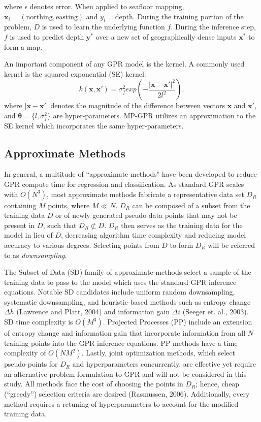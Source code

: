 \documentclass{article}
\begin{document}
where $\epsilon$ denotes error. When applied to seafloor mapping, $\boldsymbol{x}_i = (\mathrm{northing}, \mathrm{easting})$ and $y_i = \mathrm{depth}$. During the training portion of the problem, $D$ is used to learn the underlying function $f$.  During the inference step, $f$ is used to predict depth $\boldsymbol{y}^*$ over a new set of geographically dense inputs $\boldsymbol{x^*}$ to form a map.

An important component of any GPR model is the kernel. A commonly used kernel is the squared exponential (SE) kernel:
\begin{equation}
    k(\boldsymbol{x},\boldsymbol{x'}) = \sigma_f^2 exp(-\frac{|\boldsymbol{x}-\boldsymbol{x'}|^2}{2l^2}),
\end{equation}
where $|\boldsymbol{x}-\boldsymbol{x'}|$ denotes the magnitude of the difference between vectors $\boldsymbol{x}$ and $\boldsymbol{x'}$, and $\boldsymbol{\theta} = \{l,\sigma_f^2\}$ are hyper-parameters. MP-GPR utilizes an approximation to the SE kernel which incorporates the same hyper-parameters.

\subsection{Approximate Methods}
In general, a multitude of ``approximate methods" have been developed to reduce GPR compute time for regression and classification.  As standard GPR scales with $O({N^3})$, most approximate methods fabricate a representative data set $D_R$ containing $M$ points, where $M \ll N$. $D_R$ can be composed of a subset from the training data $D$ or of newly generated pseudo-data points that may not be present in $D$, such that $D_R \not\subset D$. $D_R$ then serves as the training data for the model in lieu of $D$, decreasing algorithm time complexity and reducing model accuracy to various degrees. Selecting points from $D$ to form $D_R$ will be referred to as \textit{downsampling}.

The Subset of Data (SD) family of approximate methods select a sample of the training data to pass to the model which uses the standard GPR inference equations. Notable SD candidates include uniform random downsampling, systematic downsampling, and heuristic-based methods such as entropy change $\Delta h$ (Lawrence and Platt, 2004) and information gain $\Delta i$ (Seeger et. al., 2003). SD time complexity is $O({M^3})$.  Projected Processes (PP) include an extension of entropy change and information gain that incorporate information from all $N$ training points into the GPR inference equations. PP methods have a time complexity of $O({NM^2})$. Lastly, joint optimization methods, which select pseudo-points for $D_R$ and hyperparameters concurrently, are effective yet require an alternative problem formulation to GPR and will not be considered in this study. All methods face the cost of choosing the points in $D_R$; hence, cheap (``greedy'') selection criteria are desired (Rasmussen, 2006). Additionally, every method requires a retuning of hyperparameters to account for the modified training data.
\end{document}
